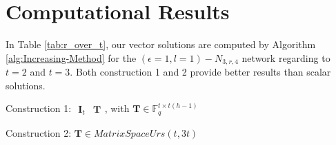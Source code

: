 \chapter{Computational Results} \label{chap:comp_method}

In Table \ref{tab:r_over_t}, our vector solutions are computed by
Algorithm \ref{alg:Increasing-Method} for the $\left(\epsilon=1,l=1\right)-\ensuremath{N}_{3,r,4}$
network regarding to $t=2$ and $t=3$. Both construction 1 and 2
provide better results than scalar solutions. 

Construction 1: $\begin{array}{c|c}
\boldsymbol{I}_{t} & \boldsymbol{T}\end{array}$, with $\boldsymbol{T}\in\ensuremath{\mathbb{F}}_{q}^{t\times t\left(h-1\right)}$

Construction 2: $\boldsymbol{T}\in MatrixSpaceUrs\left(t,3t\right)$

